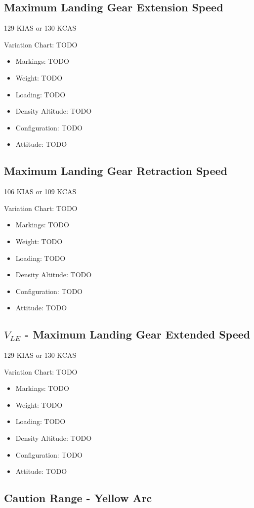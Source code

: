 \subsection{Maximum Landing Gear Extension Speed}

129 KIAS or 130 KCAS

Variation Chart: TODO
\begin{itemize}
\item Markings: TODO
\item Weight: TODO
\item Loading: TODO
\item Density Altitude: TODO
\item Configuration: TODO
\item Attitude: TODO
\end{itemize}

\subsection{Maximum Landing Gear Retraction Speed}

106 KIAS or 109 KCAS

Variation Chart: TODO
\begin{itemize}
\item Markings: TODO
\item Weight: TODO
\item Loading: TODO
\item Density Altitude: TODO
\item Configuration: TODO
\item Attitude: TODO
\end{itemize}

\subsection{$V_{LE}$ - Maximum Landing Gear Extended Speed}

129 KIAS or 130 KCAS

Variation Chart: TODO
\begin{itemize}
\item Markings: TODO
\item Weight: TODO
\item Loading: TODO
\item Density Altitude: TODO
\item Configuration: TODO
\item Attitude: TODO
\end{itemize}

\subsection{Caution Range - Yellow Arc}

